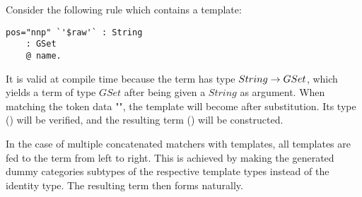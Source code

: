 \documentclass[main.tex]{subfiles}
\begin{document}
\begin{example}
Consider the following rule which contains a template:
\begin{lstlisting}
pos="nnp" `'$raw'` : String
    : GSet
    @ name.
\end{lstlisting}
It is valid at compile time because the term  has type
$String \rightarrow GSet$, which yields a term of type $GSet$ after being given
a $String$ as argument.
When matching the token data "", the template
 will become
 after substitution. Its type
() will be verified, and the resulting term
() will be constructed.
\end{example}

In the case of multiple concatenated matchers with templates, all templates
are fed to the term from left to right. This is achieved by making the
generated dummy categories subtypes of the respective template types instead
of the identity type. The resulting term then forms naturally.
\end{document}
